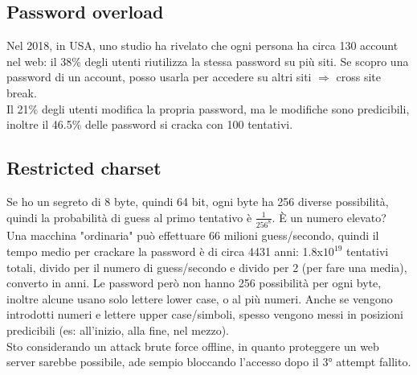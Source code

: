 \documentclass[16px]{article}
\begin{document}
\subsection{Password overload}
Nel 2018, in USA, uno studio ha rivelato che ogni persona ha circa 130 account nel web: il 38\% degli utenti riutilizza la stessa password su più siti. Se scopro una password di un account, posso usarla per accedere su altri siti $\Rightarrow$ cross site break.\\ Il 21\% degli utenti modifica la propria password, ma le modifiche sono predicibili, inoltre il 46.5\% delle password si cracka con 100 tentativi.
\subsection{Restricted charset}
Se ho un segreto di 8 byte, quindi 64 bit, ogni byte ha 256 diverse possibilità, quindi la probabilità di guess al primo tentativo è $\frac{1}{256^8}$. È un numero elevato? \\ Una macchina "ordinaria" può effettuare 66 milioni guess/secondo, quindi il tempo medio per crackare la password è di circa 4431 anni: 1.8x$10^19$ tentativi totali, divido per il numero di guess/secondo e divido per 2 (per fare una media), converto in anni.
Le password però non hanno 256 possibilità per ogni byte, inoltre alcune usano solo lettere lower case, o al più numeri. Anche se vengono introdotti numeri e lettere upper case/simboli, spesso vengono messi in posizioni predicibili (es: all'inizio, alla fine, nel mezzo). \\ Sto considerando un attack brute force offline, in quanto proteggere un web server sarebbe possibile, ade sempio bloccando l'accesso dopo il 3° attempt fallito.
\end{document}
